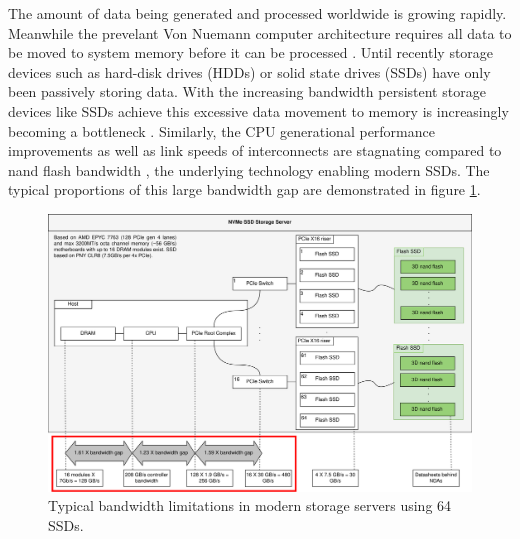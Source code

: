 The amount of data being generated and processed worldwide is growing rapidly.
Meanwhile the prevelant Von Nuemann computer architecture requires all data to
be moved to system memory before it can be processed
\cite{2018-neumann-bottleneck}. Until recently storage devices such as hard-disk
drives (HDDs) or solid state drives (SSDs) have only been passively storing
data. With the increasing bandwidth persistent storage devices like SSDs achieve
this excessive data movement to memory is increasingly becoming a bottleneck
\cite{2014-micro-ndp}. Similarly, the CPU generational performance
improvements \cite{2016-western-digital} as well as link speeds of interconnects
are stagnating compared to nand flash bandwidth \cite{10.1145/3286588}, the
underlying technology enabling modern SSDs. The typical proportions of this
large bandwidth gap are demonstrated in figure \ref{figure:storagebottleneck}.

\begin{figure}
    \centering
	\includegraphics[width=1\textwidth]{resources/images/storage-bottleneck.png}
	\caption{Typical bandwidth limitations in modern storage servers using 64
        SSDs.}
    \label{figure:storagebottleneck}
\end{figure}


